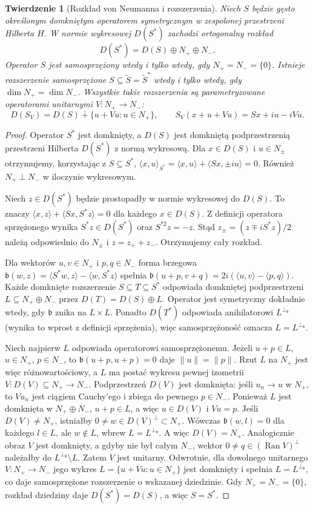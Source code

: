 \documentclass[11pt,a4paper]{article}
\numberwithin{equation}{section}
\theoremstyle{plain}
\newtheorem{twierdzenie}{Twierdzenie}[section]
\theoremstyle{definition}
\theoremstyle{remark}
\begin{document}
\begin{twierdzenie}[Rozkład von Neumanna i rozszerzenia]
\label{thm:von-neumann33}
Niech $S$ będzie gęsto określonym domkniętym operatorem
symetrycznym w zespolonej przestrzeni Hilberta $H$.
W normie wykresowej $D(S^*)$ zachodzi ortogonalny rozkład
\[
 D(S^*)=D(S)\oplus N_+\oplus N_-.
\]
Operator $S$ jest samosprzężony wtedy i tylko wtedy,
gdy $N_+=N_-=\{0\}$. Istnieje rozszerzenie samosprzężone
$S\subseteq\widetilde S=\widetilde S^*$ wtedy i tylko wtedy,
gdy $\dim N_+=\dim N_-$. Wszystkie takie rozszerzenia są
parametryzowane operatorami unitarnymi $V:N_+\to N_-$:
\[
 D(S_V)=D(S)\dotplus\{u+Vu:u\in N_+\},\qquad
 S_V(x+u+Vu)=Sx+iu-iVu.
\]
\end{twierdzenie}
\begin{proof}
Operator $S^*$ jest domknięty, a $D(S)$ jest domkniętą
podprzestrzenią przestrzeni Hilberta $D(S^*)$ z normą wykresową.
Dla $x\in D(S)$ i $u\in N_\pm$ otrzymujemy, korzystając
z $S\subseteq S^*$,
$\langle x,u\rangle_{S^*}=\langle x,u\rangle+
\langle Sx,\pm i u\rangle=0$.
Również $N_+\perp N_-$ w iloczynie wykresowym.

Niech $z\in D(S^*)$ będzie prostopadły w normie wykresowej
do $D(S)$. To znaczy
$\langle x,z\rangle+\langle Sx,S^*z\rangle=0$
dla każdego $x\in D(S)$. Z definicji operatora sprzężonego
wynika $S^*z\in D(S^*)$ oraz $S^{*2}z=-z$.
Stąd $z_\pm=(z\mp iS^*z)/2$ należą odpowiednio do $N_\pm$
i $z=z_++z_-$. Otrzymujemy cały rozkład.

Dla wektorów $u,v\in N_+$ i $p,q\in N_-$
forma brzegowa
$\mathfrak b(w,z)=\langle S^*w,z\rangle-
\langle w,S^*z\rangle$ spełnia
$\mathfrak b(u+p,v+q)=2i(\langle u,v\rangle-\langle p,q\rangle)$.
Każde domknięte rozszerzenie $S\subseteq T\subseteq S^*$
odpowiada domkniętej podprzestrzeni
$L\subseteq N_+\oplus N_-$ przez
$D(T)=D(S)\oplus L$. Operator jest symetryczny dokładnie
wtedy, gdy $\mathfrak b$ znika na $L\times L$.
Ponadto $D(T^*)$ odpowiada anihilatorowi
$L^{\perp_{\mathfrak b}}$ (wynika to wprost z definicji
sprzężenia), więc samosprzężoność oznacza
$L=L^{\perp_{\mathfrak b}}$.

Niech najpierw $L$ odpowiada operatorowi samosprzężonemu.
Jeżeli $u+p\in L$, $u\in N_+$, $p\in N_-$, to
$\mathfrak b(u+p,u+p)=0$ daje $\|u\|=\|p\|$.
Rzut $L$ na $N_+$ jest więc różnowartościowy, a $L$
ma postać wykresu pewnej izometrii
$V:D(V)\subseteq N_+\to N_-$. Podprzestrzeń $D(V)$
jest domknięta: jeśli $u_n\to u$ w $N_+$, to
$Vu_n$ jest ciągiem Cauchy'ego i zbiega do pewnego $p\in N_-$.
Ponieważ $L$ jest domknięta w $N_+\oplus N_-$,
$u+p\in L$, a więc $u\in D(V)$ i $Vu=p$. Jeśli $D(V)\ne N_+$,
istniałby $0\ne w\in D(V)^\perp\subset N_+$.
Wówczas $\mathfrak b(w,l)=0$ dla każdego $l\in L$, ale
$w\notin L$, wbrew $L=L^{\perp_{\mathfrak b}}$.
A więc $D(V)=N_+$. Analogicznie obraz $V$ jest domknięty,
a gdyby nie był całym $N_-$, wektor
$0\ne q\in (\operatorname{Ran}V)^\perp$ należałby do
$L^{\perp_{\mathfrak b}}\setminus L$. Zatem $V$ jest unitarny.
Odwrotnie, dla dowolnego unitarnego $V:N_+\to N_-$
jego wykres $L=\{u+Vu:u\in N_+\}$ jest domknięty
i spełnia $L=L^{\perp_{\mathfrak b}}$, co daje
samosprzężone rozszerzenie o wskazanej dziedzinie.
Gdy $N_+=N_- =\{0\}$, rozkład dziedziny daje
$D(S^*)=D(S)$, a więc $S=S^*$.
\end{proof}
\end{document}
